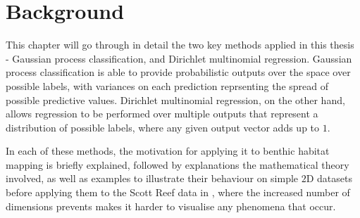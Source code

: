 \chapter{Background} \label{chap:mathbg}

This chapter will go through in detail the two key methods applied in this thesis - Gaussian process classification, 
and Dirichlet multinomial regression. Gaussian process classification is able to provide probabilistic outputs over the space over possible labels, with variances on each prediction reprsenting the spread of possible predictive values. Dirichlet multinomial regression, on the other hand, allows regression to be performed over multiple outputs that represent a distribution of possible labels, where any given output vector adds up to $1$.

In each of these methods, the motivation for applying it to benthic habitat mapping is briefly explained, followed by explanations the mathematical theory involved, as well as examples to illustrate their behaviour on simple $2$D datasets before applying them to the Scott Reef data in , where the increased number of dimensions prevents makes it harder to visualise any phenomena that occur.







